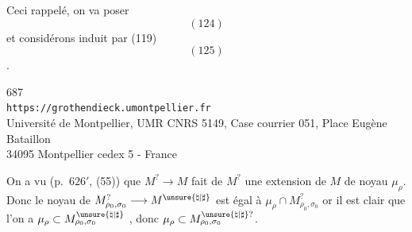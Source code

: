Ceci rappelé, on va poser
\[
(124)
\]
et considérons  induit par (119)
\[
(125)
\]
.


\begin{center}
687\\
\texttt{https://grothendieck.umontpellier.fr}\\
Université de Montpellier, UMR CNRS 5149, Case courrier 051, Place Eugène Bataillon\\
34095 Montpellier cedex 5 - France
\end{center}



On a vu (p.\ $626'$, (55)) que $M^?\longrightarrow M$ fait de $M^?$
une extension de $M$ de noyau $\mu_\rho$.
Donc le noyau de $M_{\rho_0,\sigma_0}^?\longrightarrow
M^{\unsure{\natural|\sharp}}$ est égal à
$\mu_\rho\cap M_{\rho_0,\sigma_0}^?$
or il est clair que l'on a
$\mu_\rho\subset M_{\rho_0,\sigma_0}^{\unsure{\natural|\sharp}}$
,
donc $\mu_\rho\subset
M_{\rho_0,\sigma_0}^{\unsure{\natural|\sharp}?}$.

